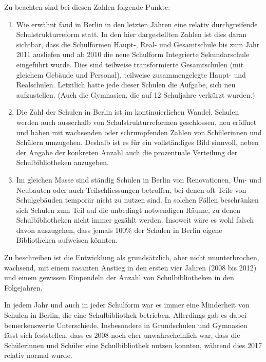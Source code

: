 \documentclass[a4paper,
fontsize=11pt,
oneside,
numbers=noperiodatend,
parskip=half-,
bibliography=totoc,
final
]{scrartcl}
\begin{document}
Zu beachten sind bei diesen Zahlen folgende Punkte:

\begin{enumerate}
\def\labelenumi{\arabic{enumi}.}
\item
  Wie erwähnt fand in Berlin in den letzten Jahren eine relativ
  durchgreifende Schulstrukturreform statt. In den hier dargestellten
  Zahlen ist dies daran sichtbar, dass die Schulformen Haupt-, Real- und
  Gesamtschule bis zum Jahr 2011 ausliefen und ab 2010 die neue
  Schulform Integrierte Sekundarschule eingeführt wurde. Dies sind
  teilweise transformierte Gesamtschulen (mit gleichem Gebäude und
  Personal), teilweise zusammengelegte Haupt- und Realschulen. Letztlich
  hatte jede dieser Schulen die Aufgabe, sich neu aufzustellen. (Auch
  die Gymnasien, die auf 12 Schuljahre verkürzt wurden.)
\item
  Die Zahl der Schulen in Berlin ist im kontinuierlichen Wandel. Schulen
  werden auch ausserhalb von Schulstrukturreformen geschlossen, neu
  eröffnet und haben mit wachsenden oder schrumpfenden Zahlen von
  Schülerinnen und Schülern umzugehen. Deshalb ist es für ein
  vollständiges Bild sinnvoll, neben der Angabe der konkreten Anzahl
  auch die prozentuale Verteilung der Schulbibliotheken anzugeben.
\item
  Im gleichen Masse sind ständig Schulen in Berlin von Renovationen, Um-
  und Neubauten oder auch Teilschliessungen betroffen, bei denen oft
  Teile von Schulgebäuden temporär nicht zu nutzen sind. In solchen
  Fällen beschränken sich Schulen zum Teil auf die unbedingt notwendigen
  Räume, zu denen Schulbibliotheken nicht immer gezählt werden. Insoweit
  wäre es wohl falsch davon auszugehen, dass jemals 100\% der Schulen in
  Berlin eigene Bibliotheken aufweisen könnten.
\end{enumerate}

Zu beschreiben ist die Entwicklung als grundsätzlich, aber nicht
ununterbrochen, wachsend, mit einem rasanten Anstieg in den ersten vier
Jahren (2008 bis 2012) und einem gewissen Einpendeln der Anzahl von
Schulbibliotheken in den Folgejahren.

In jedem Jahr und auch in jeder Schulform war es immer eine Minderheit
von Schulen in Berlin, die eine Schulbibliothek betrieben. Allerdings
gab es dabei bemerkenswerte Unterschiede. Insbesondere in Grundschulen
und Gymnasien lässt sich feststellen, dass es 2008 noch eher
unwahrscheinlich war, dass die Schülerinnen und Schüler eine
Schulbibliothek nutzen konnten, während dies 2017 relativ normal wurde.
\end{document}
